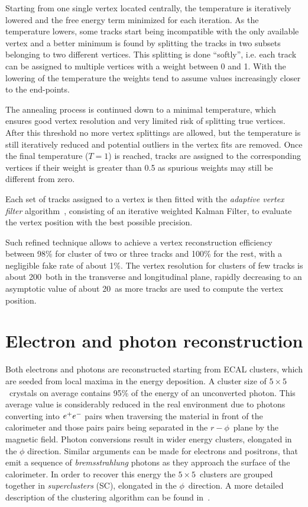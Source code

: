 Starting from one single vertex located centrally, the temperature is iteratively lowered and the free energy term minimized for each iteration. As the temperature lowers, some tracks start being incompatible with the only available vertex and a better minimum is found by splitting the tracks in two subsets belonging to two different vertices. This splitting is done ``softly'', i.e. each track can be assigned to multiple vertices with a weight between 0 and 1. With the lowering of the temperature the weights tend to assume values increasingly closer to the end-points.

The annealing process is continued down to a minimal temperature, which ensures good vertex resolution and very limited risk of splitting true vertices. After this threshold no more vertex splittings are allowed, but the temperature is still iteratively reduced and potential outliers in the vertex fits are removed. Once the final temperature ($T=1$) is reached, tracks are assigned to the corresponding vertices if their weight is greater than 0.5 as spurious weights may still be different from zero. 

Each set of tracks assigned to a vertex is then fitted with the \emph{adaptive vertex filter} algorithm~\cite{CMS_NOTE_2007-008}, consisting of an iterative weighted Kalman Filter, to evaluate the vertex position with the best possible precision.

Such refined technique allows to achieve a vertex reconstruction efficiency between 98\% for cluster  of two or three tracks and 100\% for the rest, with a negligible fake rate of about 1\%. The vertex resolution for clusters of few tracks is about 200~\um both in the transverse and longitudinal plane, rapidly decreasing to an asymptotic value of about 20~\um as more tracks are used to compute the vertex position.

\section{Electron and photon reconstruction}

Both electrons and photons are reconstructed starting from ECAL clusters, which are seeded from local maxima in the energy deposition. A cluster size of $5\times5$\ crystals on average contains 95\% of the energy of an unconverted photon. This average value is considerably reduced in the real environment due to photons converting into $e^{+}e^{-}$ pairs when traversing the material in front of the calorimeter and those pairs pairs being separated in the $r-\phi$\ plane by the magnetic field. Photon conversions result in wider energy clusters, elongated in the $\phi$ direction. Similar arguments can be made for electrons and positrons, that emit a sequence of \emph{bremsstrahlung} photons as they approach the surface of the calorimeter. In order to recover this energy the $5\times5$\ clusters are grouped together in \emph{superclusters} (SC), elongated in the $\phi$\ direction. A more detailed description of the clustering algorithm can be found in~\cite{CMS:2006tdr1}.

